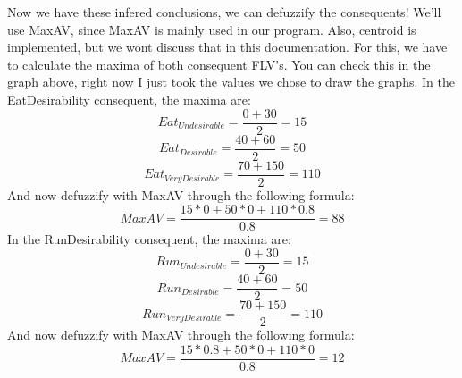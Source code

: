 Now we have these infered conclusions, we can defuzzify the consequents!
We'll use MaxAV, since MaxAV is mainly used in our program.
Also, centroid is implemented, but we wont discuss that in this documentation.
For this, we have to calculate the maxima of both consequent FLV's.
You can check this in the graph above, right now I just took the values we chose to draw the graphs.
In the EatDesirability consequent, the maxima are:
\begin{equation}
    Eat_{Undesirable} = \frac{0 + 30}2 = 15
\end{equation}
\begin{equation}
    Eat_{Desirable} = \frac{40 + 60}2 = 50
\end{equation}
\begin{equation}
    Eat_{VeryDesirable} = \frac{70 + 150}2 = 110
\end{equation}
And now defuzzify with MaxAV through the following formula:
\begin{equation}
    MaxAV = \frac{15 * 0 + 50 * 0 + 110 * 0.8}{0.8} = 88
\end{equation}
In the RunDesirability consequent, the maxima are:
\begin{equation}
    Run_{Undesirable} = \frac{0 + 30}2 = 15
\end{equation}
\begin{equation}
    Run_{Desirable} = \frac{40 + 60}2 = 50
\end{equation}
\begin{equation}
    Run_{VeryDesirable} = \frac{70 + 150}2 = 110
\end{equation}
And now defuzzify with MaxAV through the following formula:
\begin{equation}
    MaxAV = \frac{15 * 0.8 + 50 * 0 + 110 * 0}{0.8} = 12
\end{equation}
